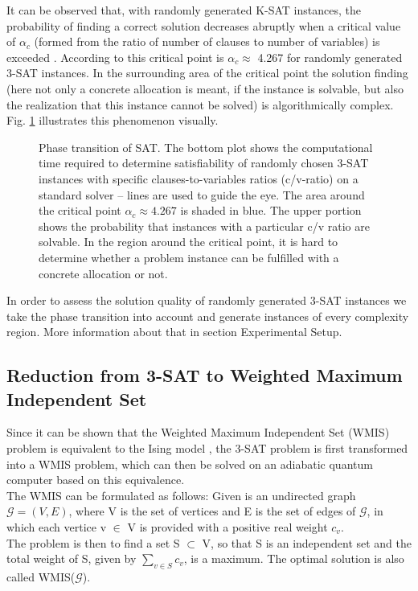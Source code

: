 It can be observed that, with randomly generated K-SAT instances, the probability of finding a correct solution decreases abruptly when a critical value of $\alpha_{c}$ (formed from the ratio of number of clauses to number of variables) is exceeded \cite{monasson1996entropy}. According to \cite{mezard2002random} this critical point is $\alpha_{c} \approx $ 4.267 for randomly generated 3-SAT instances. In the surrounding area of the critical point the solution finding (here not only a concrete allocation is meant, if the instance is solvable, but also the realization that this instance cannot be solved) is algorithmically complex. Fig. \ref{fig:crit_sat} illustrates this phenomenon visually.

\begin{figure}
	\centering
	
	\caption{Phase transition of SAT. The bottom plot shows the computational time required to determine satisfiability of randomly chosen 3-SAT instances with specific clauses-to-variables ratios (c/v-ratio) on a standard solver -- lines are used to guide the eye. The area around the critical point $\alpha_{c} \approx 4.267$ is shaded in blue.\newline
          The upper portion shows the probability that instances with a particular c/v ratio are solvable. In the region around the critical point, it is hard to determine whether a problem instance can be fulfilled with a concrete allocation or not.} \label{fig:crit_sat} \end{figure}

In order to assess the solution quality of randomly generated 3-SAT instances we take the phase transition into account
and generate instances of every complexity region. More information about that in section Experimental Setup.

\subsection{Reduction from 3-SAT to Weighted Maximum Independent Set}
Since it can be shown that the Weighted Maximum Independent Set (WMIS) problem is equivalent to the Ising model \cite{choi2008minor}, the 3-SAT problem is first transformed into a WMIS problem, which can then be solved on an adiabatic quantum computer based on this equivalence.\\

The WMIS can be formulated as follows: Given is an undirected graph $\mathcal{G} = (V, E)$, where V is the set of vertices and E is the set of edges of $\mathcal{G}$, in which each vertice v $\in$ V is provided with a positive real weight $c_{v}$.\\
The problem is then to find a set S $\subset$ V, so that S is an independent set and the total weight of S, given by $\sum_{v \in S} c_{v}$, is a maximum. The optimal solution is also called WMIS($\mathcal{G}$).

